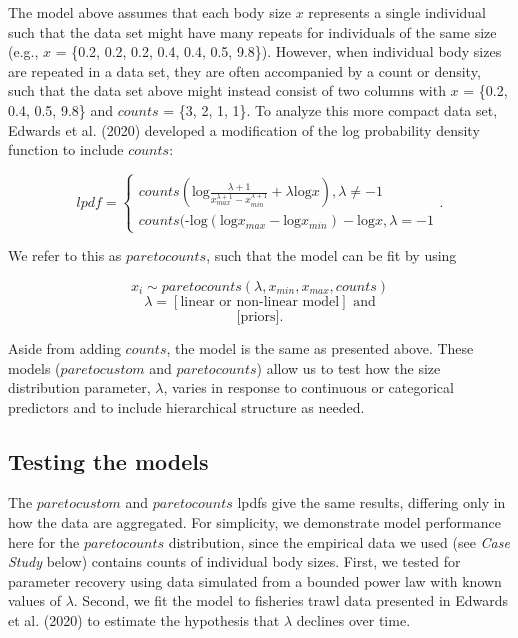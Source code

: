 \documentclass[
  12pt,
]{article}
\numberwithin{equation}
\begin{document}
The model above assumes that each body size \(x\) represents a single
individual such that the data set might have many repeats for
individuals of the same size (e.g., \(x\) = \{0.2, 0.2, 0.2, 0.4, 0.4,
0.5, 9.8\}). However, when individual body sizes are repeated in a data
set, they are often accompanied by a count or density, such that the
data set above might instead consist of two columns with \(x\) = \{0.2,
0.4, 0.5, 9.8\} and \(counts\) = \{3, 2, 1, 1\}. To analyze this more
compact data set, Edwards et al. (2020) developed a modification of the
log probability density function to include \(counts\):

\[
 lpdf = \begin{cases}\textit{counts}(\text{log}\frac{\lambda + 1}{{x_{max}^{\lambda+1}} - {x_{min}^{\lambda+1}}} + \lambda\text{log}x), \lambda \neq-1 \\
\textit{counts}(
\text{-log}({{\text{log}x_{max}} - {\text{log}x_{min}}}) -\text{log}x, \lambda = -1\end{cases}.
\]

We refer to this as \(paretocounts\), such that the model can be fit by
using

\[x_i\sim paretocounts(\lambda, x_{min}, x_{max}, counts)\]
\[\lambda = [\text{linear or non-linear model}] \text{ and}\]
\[\text{[priors]}.\]

Aside from adding \(counts\), the model is the same as presented above.
These models (\(paretocustom\) and \(paretocounts\)) allow us to test
how the size distribution parameter, \(\lambda\), varies in response to
continuous or categorical predictors and to include hierarchical
structure as needed.

\hypertarget{testing-the-models}{%
\subsection{Testing the models}\label{testing-the-models}}

The \(paretocustom\) and \(paretocounts\) lpdfs give the same results,
differing only in how the data are aggregated. For simplicity, we
demonstrate model performance here for the \(paretocounts\)
distribution, since the empirical data we used (see \emph{Case Study}
below) contains counts of individual body sizes. First, we tested for
parameter recovery using data simulated from a bounded power law with
known values of \(\lambda\). Second, we fit the model to fisheries trawl
data presented in Edwards et al. (2020) to estimate the hypothesis that
\(\lambda\) declines over time.
\end{document}
